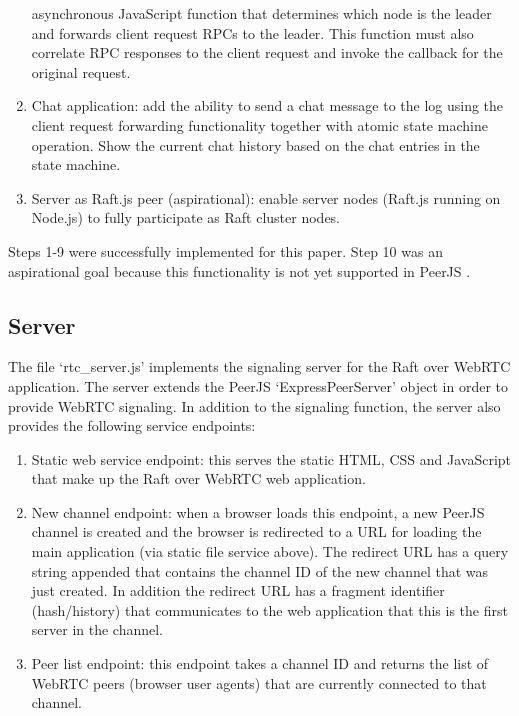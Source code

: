 \documentclass[conference,compsoc]{./IEEEtran/IEEEtran}
\begin{document}
\begin{enumerate}
    asynchronous JavaScript function that determines which node is the
    leader and forwards client request RPCs to the leader. This
    function must also correlate RPC responses to the client request
    and invoke the callback for the original request.
\item Chat application: add the ability to send a chat message to the
    log using the client request forwarding functionality together
    with atomic state machine operation. Show the current chat history
    based on the chat entries in the state machine.
\item Server as Raft.js peer (aspirational): enable server nodes
    (Raft.js running on Node.js) to fully participate as Raft cluster
    nodes.
\end{enumerate}

Steps 1-9 were successfully implemented for this paper. Step 10 was an
aspirational goal because this functionality is not yet supported in
PeerJS \cite{peerjs:103}.

\fi  %

\subsection{Server}

The file `rtc\_server.js' implements the signaling server for the Raft
over WebRTC application. The server extends the PeerJS
`ExpressPeerServer' object in order to provide WebRTC signaling. In
addition to the signaling function, the server also provides the
following service endpoints:

\begin{enumerate}
\item Static web service endpoint: this serves the static HTML, CSS
    and JavaScript that make up the Raft over WebRTC web application.
\item New channel endpoint: when a browser loads this endpoint, a new
    PeerJS channel is created and the browser is redirected to a URL
    for loading the main application (via static file service above).
    The redirect URL has a query string appended that contains the
    channel ID of the new channel that was just created. In addition
    the redirect URL has a fragment identifier (hash/history) that
    communicates to the web application that this is the first server
    in the channel.
\item Peer list endpoint: this endpoint takes a channel ID and returns
    the list of WebRTC peers (browser user agents) that are currently
    connected to that channel.

\end{enumerate}
\end{document}
